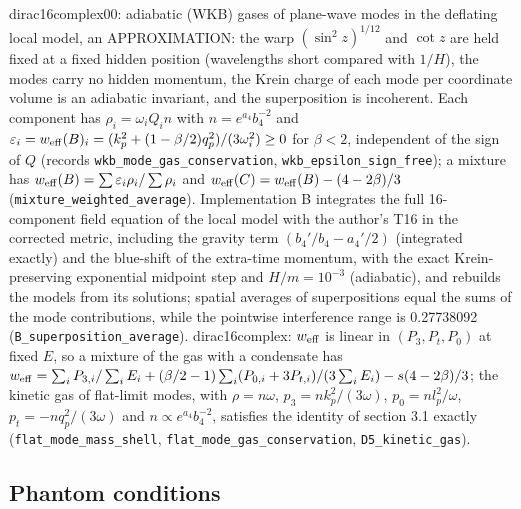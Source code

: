 \documentclass[11pt]{article}
\begin{document}
dirac16complex00: adiabatic (WKB) gases of plane-wave modes in the deflating local model, an APPROXIMATION: the warp $(\sin^2 z)^{1/12}$ and $\cot z$ are held fixed at a fixed hidden position (wavelengths short compared with $1/H$), the modes carry no hidden momentum, the Krein charge of each mode per coordinate volume is an adiabatic invariant, and the superposition is incoherent. Each component has $\rho_i = \omega_iQ_in$ with $n = e^{a_4}b_4^{-2}$ and $\varepsilon_i = w_{\rm eff}(B)_i = (k_p^2 + (1 - \beta/2)q_p^2)/(3\omega_i^2) \geq 0$ for $\beta < 2$, independent of the sign of $Q$ (records \texttt{wkb\_mode\allowbreak{}\_gas\_con\allowbreak{}servatio\allowbreak{}n}, \texttt{wkb\_epsi\allowbreak{}lon\_sign\allowbreak{}\_free}); a mixture has $w_{\rm eff}(B) = \sum\varepsilon_i\rho_i/\sum\rho_i$ and $w_{\rm eff}(C) = w_{\rm eff}(B) - (4 - 2\beta)/3$ (\texttt{mixture\_\allowbreak{}weighted\allowbreak{}\_average}). Implementation B integrates the full 16-component field equation of the local model with the author's T16 in the corrected metric, including the gravity term $(b_4'/b_4 - a_4'/2)$ (integrated exactly) and the blue-shift of the extra-time momentum, with the exact Krein-preserving exponential midpoint step and $H/m = 10^{-3}$ (adiabatic), and rebuilds the models from its solutions; spatial averages of superpositions equal the sums of the mode contributions, while the pointwise interference range is 0.27738092 (\texttt{B\_superp\allowbreak{}osition\_\allowbreak{}average}). dirac16complex: $w_{\rm eff}$ is linear in $(P_3, P_t, P_0)$ at fixed $E$, so a mixture of the gas with a condensate has $w_{\rm eff} = \sum_iP_{3,i}/\sum_iE_i + (\beta/2 - 1)\sum_i(P_{0,i} + 3P_{t,i})/(3\sum_iE_i) - s(4 - 2\beta)/3$; the kinetic gas of flat-limit modes, with $\rho = n\omega$, $p_3 = nk_p^2/(3\omega)$, $p_0 = nl_p^2/\omega$, $p_t = -nq_p^2/(3\omega)$ and $n \propto e^{a_4}b_4^{-2}$, satisfies the identity of section 3.1 exactly (\texttt{flat\_mod\allowbreak{}e\_mass\_s\allowbreak{}hell}, \texttt{flat\_mod\allowbreak{}e\_gas\_co\allowbreak{}nservati\allowbreak{}on}, \texttt{D5\_kinet\allowbreak{}ic\_gas}).

\subsection{Phantom conditions}
\end{document}
